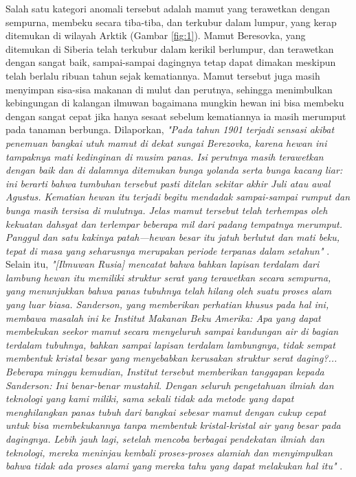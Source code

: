\documentclass[10pt,twocolumn,letterpaper]{article}
\begin{document}
Salah satu kategori anomali tersebut adalah mamut yang terawetkan dengan sempurna, membeku secara tiba-tiba, dan terkubur dalam lumpur, yang kerap ditemukan di wilayah Arktik (Gambar \ref{fig:1}). Mamut Beresovka, yang ditemukan di Siberia telah terkubur dalam kerikil berlumpur, dan terawetkan dengan sangat baik, sampai-sampai dagingnya tetap dapat dimakan meskipun telah berlalu ribuan tahun sejak kematiannya. Mamut tersebut juga masih menyimpan sisa-sisa makanan di mulut dan perutnya, sehingga menimbulkan kebingungan di kalangan ilmuwan bagaimana mungkin hewan ini bisa membeku dengan sangat cepat jika hanya sesaat sebelum kematiannya ia masih merumput pada tanaman berbunga\cite{17}. Dilaporkan, \textit{"Pada tahun 1901 terjadi sensasi akibat penemuan bangkai utuh mamut di dekat sungai Berezovka, karena hewan ini tampaknya mati kedinginan di musim panas. Isi perutnya masih terawetkan dengan baik dan di dalamnya ditemukan bunga yolanda serta bunga kacang liar: ini berarti bahwa tumbuhan tersebut pasti ditelan sekitar akhir Juli atau awal Agustus. Kematian hewan itu terjadi begitu mendadak sampai-sampai rumput dan bunga masih tersisa di mulutnya. Jelas mamut tersebut telah terhempas oleh kekuatan dahsyat dan terlempar beberapa mil dari padang tempatnya merumput. Panggul dan satu kakinya patah—hewan besar itu jatuh berlutut dan mati beku, tepat di masa yang seharusnya merupakan periode terpanas dalam setahun"} \cite{18}. Selain itu, \textit{"[Ilmuwan Rusia] mencatat bahwa bahkan lapisan terdalam dari lambung hewan itu memiliki struktur serat yang terawetkan secara sempurna, yang menunjukkan bahwa panas tubuhnya telah hilang oleh suatu proses alam yang luar biasa. Sanderson, yang memberikan perhatian khusus pada hal ini, membawa masalah ini ke Institut Makanan Beku Amerika: Apa yang dapat membekukan seekor mamut secara menyeluruh sampai kandungan air di bagian terdalam tubuhnya, bahkan sampai lapisan terdalam lambungnya, tidak sempat membentuk kristal besar yang menyebabkan kerusakan struktur serat daging?... Beberapa minggu kemudian, Institut tersebut memberikan tanggapan kepada Sanderson: Ini benar-benar mustahil. Dengan seluruh pengetahuan ilmiah dan teknologi yang kami miliki, sama sekali tidak ada metode yang dapat menghilangkan panas tubuh dari bangkai sebesar mamut dengan cukup cepat untuk bisa membekukannya tanpa membentuk kristal-kristal air yang besar pada dagingnya. Lebih jauh lagi, setelah mencoba berbagai pendekatan ilmiah dan teknologi, mereka meninjau kembali proses-proses alamiah dan menyimpulkan bahwa tidak ada proses alami yang mereka tahu yang dapat melakukan hal itu"} \cite{19}.
\end{document}
